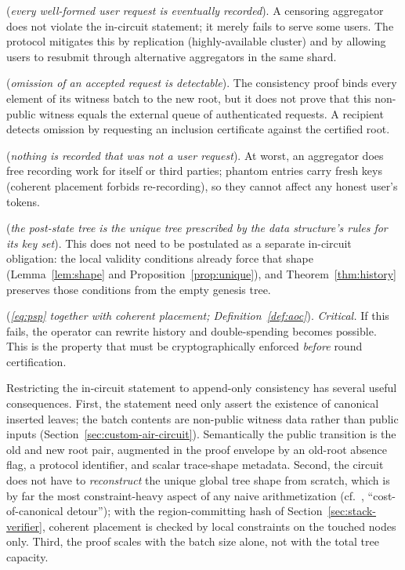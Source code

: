 \documentclass[twocolumn]{article}
\begin{document}
\begin{description}[nosep]
    \item[Request liveness] (\emph{every well-formed user request is eventually recorded}). A censoring aggregator does not violate the in-circuit statement; it merely fails to serve some users. The protocol mitigates this by replication (highly-available cluster) and by allowing users to resubmit through alternative aggregators in the same shard.
    \item[Submitted-request accountability] (\emph{omission of an accepted request is detectable}). The consistency proof binds every element of its witness batch to the new root, but it does not prove that this non-public witness equals the external queue of authenticated requests. A recipient detects omission by requesting an inclusion certificate against the certified root.
    \item[No phantom inserts] (\emph{nothing is recorded that was not a user request}). At worst, an aggregator does free recording work for itself or third parties; phantom entries carry fresh keys (coherent placement forbids re-recording), so they cannot affect any honest user's tokens.
    \item[Unique Patricia shape] (\emph{the post-state tree is the unique tree prescribed by the data structure's rules for its key set}). This does not need to be postulated as a separate in-circuit obligation: the local validity conditions already force that shape (Lemma~\ref{lem:shape} and Proposition~\ref{prop:unique}), and Theorem~\ref{thm:history} preserves those conditions from the empty genesis tree.
    \item[Append-only consistency] (\emph{\eqref{eq:psp} together with coherent placement; Definition~\ref{def:aoc}}). \emph{Critical.} If this fails, the operator can rewrite history and double-spending becomes possible. This is the property that must be cryptographically enforced \emph{before} round certification.
\end{description}

Restricting the in-circuit statement to append-only consistency has several useful consequences. First, the statement need only assert the existence of canonical inserted leaves; the batch contents are non-public witness data rather than public inputs (Section~\ref{sec:custom-air-circuit}). Semantically the public transition is the old and new root pair, augmented in the proof envelope by an old-root absence flag, a protocol identifier, and scalar trace-shape metadata. Second, the circuit does not have to \emph{reconstruct} the unique global tree shape from scratch, which is by far the most constraint-heavy aspect of any naive arithmetization (cf.~\cite{rsmtair}, ``cost-of-canonical detour''); with the region-committing hash of Section~\ref{sec:stack-verifier}, coherent placement is checked by local constraints on the touched nodes only. Third, the proof scales with the batch size alone, not with the total tree capacity.
\end{document}
